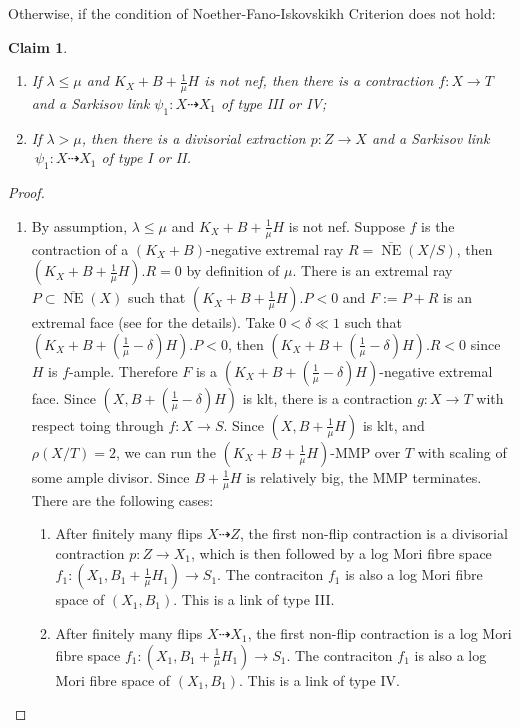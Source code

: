 \documentclass[11pt]{amsart}
\newtheorem{claim}[defn]{Claim}
\begin{document}
Otherwise, if the condition of Noether-Fano-Iskovskikh Criterion does not hold:
\begin{claim}
  \begin{enumerate}
  \item If $ \lambda\leqslant\mu $ and $ K_X+B+\frac{1}{\mu}H $ is not nef, then there is a contraction $f:X \to T$ and a Sarkisov link $\psi_{1}:X\dashrightarrow X_{1}$ of type III or IV;
  \item  If $ \lambda>\mu $, then there is a divisorial extraction $p:Z\to X$ and a Sarkisov link $\
     \psi_{1}:X\dashrightarrow X_{1}$ of type I or II.
\end{enumerate} 
\end{claim}
\begin{proof}
\begin{enumerate}
  \item\label{a} By assumption,  $\lambda\leqslant \mu$ and   $ K_X+B+\frac{1}{\mu}H $ is not nef. Suppose $ f $ is the contraction of a $ (K_X+B) $-negative extremal ray $ R= \overline{\operatorname{ NE }}(X/S) $, then $ (K_X+B+\frac{1}{\mu}H).R=0 $ by definition of $ \mu $. There is an extremal ray $ P \subset \overline{\operatorname{ NE }}(X) $ such that $ (K_X+B+\frac{1}{\mu}H).P<0 $ and $ F:=P+R $ is an extremal face  (see \cite[5.4.2]{cortiFactoringBirationalMaps} for the details). Take  $ 0<\delta\ll 1 $ such that $ (K_X+B+(\frac{1}{\mu}-\delta)H).P<0 $, then $  (K_X+B+(\frac{1}{\mu}-\delta)H).R<0 $ since $H$ is $f$-ample. Therefore $ F $ is a $  (K_X+B+(\frac{1}{\mu}-\delta)H) $-negative extremal face. Since $ (X,B+(\frac{1}{\mu}-\delta)H) $ is klt, there is  a contraction $ g:X\to T $ with respect  toing through $ f:X\to S $. Since  $ (X,B+\frac{1}{\mu}H) $ is klt, and $ \rho(X/T)=2 $,  we can  run the  $ (K_X+B+\frac{1}{\mu}H) $-MMP over $T$ with scaling of some ample divisor.  Since $ B+\frac{1}{\mu}H $ is relatively big,  the MMP terminates. There are the following cases: 
  \begin{enumerate}
    \item\label{a1} 
      After finitely many flips $ X\dashrightarrow Z $, the first non-flip contraction is a divisorial contraction $ p:Z\to X_1 $, which is then followed by a log Mori fibre space $f_{1}:(X_{1},B_{1}+\frac{1}{\mu}H_{1})\to S_1$. The contraciton $f_1$ is also a log Mori fibre space of $(X_{1},B_{1})$.
    This is a link of type III.     
   \item\label{a2}
      After finitely many flips $ X\dashrightarrow X_1 $, the first non-flip contraction is a log Mori fibre space $ f_1:(X_1,B_1+\frac{1}{\mu}H_1)\to S_{1} $. The contraciton $f_1$ is also a log Mori fibre space of $(X_{1},B_{1})$. This is a link of type IV.  

\end{enumerate}
\end{enumerate}
\end{proof}
\end{document}
